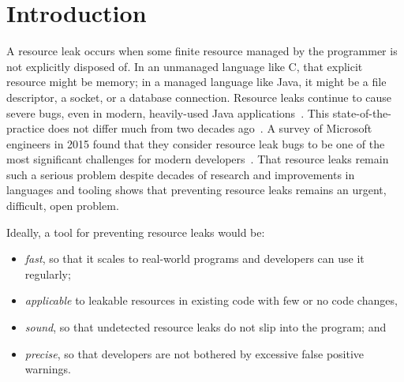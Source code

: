 \section{Introduction}
\label{sec:intro}


A resource leak occurs when some finite resource managed by the
programmer is not explicitly disposed of. In an unmanaged language
like C, that explicit resource might be memory; in a managed language
like Java, it might be a file descriptor, a socket, or a database
connection.  Resource leaks continue to cause severe bugs, even in
modern, heavily-used Java applications~\cite{ghanavati2020memory}.
This state-of-the-practice does not differ much from two decades
ago~\cite{WeimerN04}. 
A survey of Microsoft engineers in 2015 found
that they consider resource leak bugs to be one of the most
significant challenges for modern developers~\cite{LoNZ2015}.  That
resource leaks remain such a serious problem despite decades of
research and improvements in languages and tooling shows that
preventing resource leaks remains an urgent, difficult, open problem.


Ideally, a tool for preventing resource leaks would be:
\begin{itemize}
\item \emph{fast}, so that it scales to real-world programs and
  developers can use it regularly;
\item \emph{applicable} to leakable resources in existing code with few or no code changes,
\item \emph{sound}, so that undetected resource leaks do not slip into
  the program; and
\item \emph{precise}, so that developers are not bothered by excessive false positive
  warnings.
\end{itemize}



